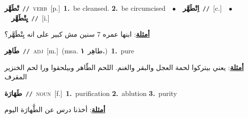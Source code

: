 \documentclass[10pt,a4paper,twoside]{article} %
\begin{document}
\begin{multicols}{2}
{\setlength\topsep{0pt}\textbf{\foreignlanguage{arabic}{تْطَهَّر}}\ {\color{gray}\texttt{//}\color{black}}\ \textsc{verb}\ [p.]\ \textbf{1.}~be cleansed.  \textbf{2.}~be circumcised\ \ $\bullet$\ \ \setlength\topsep{0pt}\textbf{\foreignlanguage{arabic}{اِتْطَهَّر}}\ {\color{gray}\texttt{//}\color{black}}\ [c.]\ \ $\bullet$\ \ \setlength\topsep{0pt}\textbf{\foreignlanguage{arabic}{يِتْطَهَّر}}\ {\color{gray}\texttt{//}\color{black}}\ [i.]\  \begin{flushright}\color{gray}\foreignlanguage{arabic}{\textbf{\underline{\foreignlanguage{arabic}{أمثلة}}}: ابنها عمره 7 سنين مش كبير على انه يِتْطَهَّر؟}\end{flushright}\color{black}} \vspace{2mm}

{\setlength\topsep{0pt}\textbf{\foreignlanguage{arabic}{طَاهِر}}\ {\color{gray}\texttt{//}\color{black}}\ \textsc{adj}\ [m.]\ \color{gray}(msa. \foreignlanguage{arabic}{طاهِر}~\foreignlanguage{arabic}{\textbf{١.}})\color{black}\ \textbf{1.}~pure\  \begin{flushright}\color{gray}\foreignlanguage{arabic}{\textbf{\underline{\foreignlanguage{arabic}{أمثلة}}}: يعني بيتركوا لحمة العجل والبقر والغنم. اللحم الطّاهر وبيلحقوا ورا لحم الخنزير المقرف}\end{flushright}\color{black}} \vspace{2mm}

{\setlength\topsep{0pt}\textbf{\foreignlanguage{arabic}{طَهَارَة}}\ {\color{gray}\texttt{//}\color{black}}\ \textsc{noun}\ [f.]\ \textbf{1.}~purification  \textbf{2.}~ablution  \textbf{3.}~purity\  \begin{flushright}\color{gray}\foreignlanguage{arabic}{\textbf{\underline{\foreignlanguage{arabic}{أمثلة}}}: أخذنا درس عن الطَّهارَة اليوم}\end{flushright}\color{black}} \vspace{2mm}


\end{multicols}
\end{document}
